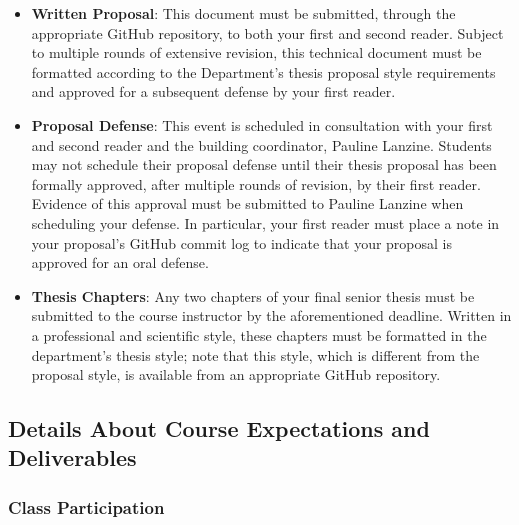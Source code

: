 \documentclass[11pt]{article}
\begin{document}
\begin{itemize}
  \item {\bf Written Proposal}: This document must be submitted, through the
    appropriate GitHub repository, to both your first and second reader. Subject
    to multiple rounds of extensive revision, this technical document must be
    formatted according to the Department's thesis proposal style requirements
    and approved for a subsequent defense by your first reader.

  \item {\bf Proposal Defense}: This event is scheduled in consultation with
    your first and second reader and the building coordinator, Pauline Lanzine.
    Students may not schedule their proposal defense until their thesis proposal
    has been formally approved, after multiple rounds of revision, by their
    first reader. Evidence of this approval must be submitted to Pauline Lanzine
    when scheduling your defense. In particular, your first reader must place a
    note in your proposal's GitHub commit log to indicate that your proposal is
    approved for an oral defense.

  \item {\bf Thesis Chapters}: Any two chapters of your final senior thesis must
    be submitted to the course instructor by the aforementioned deadline.
    Written in a professional and scientific style, these chapters must be
    formatted in the department's thesis style; note that this style, which is
    different from the proposal style, is available from an appropriate GitHub
    repository.

\end{itemize}

\subsection*{Details About Course Expectations and Deliverables}

\subsubsection*{Class Participation}
\end{document}
